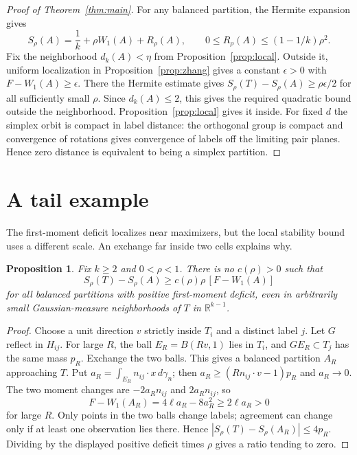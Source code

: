 \documentclass[11pt,reqno]{amsart}
\newtheorem{proposition}[theorem]{Proposition}
\newcommand{\R}{\mathbb R}
\newcommand{\ga}{\gamma}
\begin{document}
\begin{proof}[Proof of Theorem~\ref{thm:main}]
For any balanced partition, the Hermite expansion gives
\[
 S_\rho(A)=\frac1k+\rho W_1(A)+R_\rho(A),\qquad
 0\le R_\rho(A)\le(1-1/k)\rho^2 .
\]
Fix the neighborhood $d_k(A)<\eta$ from Proposition~\ref{prop:local}.
Outside it, uniform localization in Proposition~\ref{prop:zhang}
gives a constant $\epsilon>0$ with $F-W_1(A)\ge\epsilon$. There the
Hermite estimate gives $S_\rho(T)-S_\rho(A)\ge\rho\epsilon/2$ for all
sufficiently small $\rho$. Since $d_k(A)\le2$, this gives the required
quadratic bound outside the neighborhood. Proposition~\ref{prop:local}
gives it inside. For fixed $d$ the simplex orbit is compact in label
distance: the orthogonal group is compact and convergence of rotations
gives convergence of labels off the limiting pair planes. Hence zero
distance is equivalent to being a simplex partition.
\end{proof}

\section{A tail example}

The first-moment deficit localizes near maximizers, but the local
stability bound uses a different scale. An exchange far inside two
cells explains why.

\begin{proposition}\label{prop:obstruction}
Fix $k\ge2$ and $0<\rho<1$. There is no $c(\rho)>0$ such that
\[
 S_\rho(T)-S_\rho(A)\ge c(\rho)\rho\,[F-W_1(A)]
\]
for all balanced partitions with positive first-moment deficit, even in
arbitrarily small Gaussian-measure neighborhoods of $T$ in $\R^{k-1}$.
\end{proposition}

\begin{proof}
Choose a unit direction $v$ strictly inside $T_i$ and a distinct label
$j$. Let $G$ reflect in $H_{ij}$. For large $R$, the ball
$E_R=B(Rv,1)$ lies in $T_i$, and $GE_R\subset T_j$ has the same
mass $p_R$. Exchange the two balls. This gives a balanced partition
$A_R$ approaching $T$. Put
$a_R=\int_{E_R}n_{ij}\cdot x\,d\ga_n$; then
$a_R\ge(Rn_{ij}\cdot v-1)p_R$ and $a_R\to0$.
The two moment changes are $-2a_Rn_{ij}$ and $2a_Rn_{ij}$, so
\[
 F-W_1(A_R)=4\ell a_R-8a_R^2\ge2\ell a_R>0
\]
for large $R$. Only points in the two balls change labels; agreement can
change only if at least one observation lies there. Hence
$|S_\rho(T)-S_\rho(A_R)|\le4p_R$. Dividing by the displayed
positive deficit times $\rho$ gives a ratio tending to zero.
\end{proof}
\end{document}
